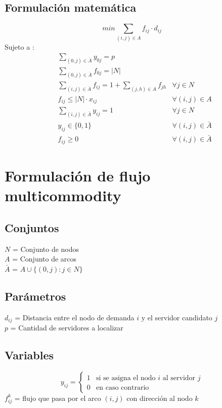\documentclass{article}
\numberwithin{equation}{section}
\begin{document}
\subsection{Formulación matemática}
\begin{equation}
min \sum_{(i,j) \in A} f_{ij} \cdot d_{ij}
\end{equation}
Sujeto a : \begin{align}
& \sum_{(0,j) \in \bar{A}} y_{0j} = p \\
& \sum_{(0,j) \in \bar{A}} f_{0j} = |N|\\
& \sum_{(i,j) \in \bar{A}} f_{ij} = 1 + \sum_{(j,h) \in A} f_{jh} &\forall j \in N \\
& f_{ij} \leq |N| \cdot x_{ij} &\forall (i,j) \in A\\
& \sum_{(i,j) \in \bar{A}} y_{ij} = 1 &\forall j \in N \\
& y_{ij} \in \{0,1\} &\forall (i,j) \in \bar{A}\\
& f_{ij} \geq 0 &\forall (i,j) \in \bar{A}
\end{align}

\newpage
\section{Formulación de flujo multicommodity}
\subsection{Conjuntos}
$N$ = Conjunto de nodos\\
$A$ = Conjunto de arcos\\
$\bar{A}$ = $A \cup \{(0,j):j \in N\} $
\subsection{Parámetros}
$d_{ij}$ = Distancia entre el nodo de demanda $i$ y el servidor candidato $j$\\
$p$ = Cantidad de servidores a localizar
\subsection{Variables}
\begin{center}
\[y_{ij}={\begin{cases}1&{\mbox{si se asigna el nodo $i$ al servidor $j$}}\\0&{\mbox{en caso contrario}}\end{cases}}
\]
$f_{ij}^k$ = flujo que pasa por el arco $(i,j)$ con dirección al nodo $k$
\end{center}
\end{document}
